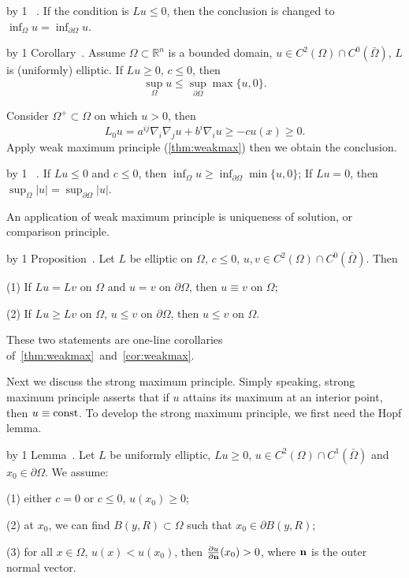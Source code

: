 \advance\propcount by 1
~\/\propnumber.
If the condition is $Lu\leq 0$, then the conclusion is changed to $\inf_{\Omega}u=\inf_{\partial\Omega}u$.
\medskip

\advance\propcount by 1
\proclaim Corollary~\propnumber.
Assume $\Omega\subset\mathbb{R}^n$ is a bounded domain, $u\in C^2(\Omega)\cap C^0(\bar\Omega)$, $L$ is (uniformly) elliptic.
If $Lu\geq 0$, $c\leq 0$, then
$$\sup_{\Omega}u\leq\sup_{\partial\Omega}\max\{u,0\}.$$

\demo
Consider $\Omega^+\subset\Omega$ on which $u>0$, then
$$L_0u=a^{ij}\nabla_i\nabla_ju+b^i\nabla_iu\geq-cu(x)\geq 0.$$
Apply weak maximum principle (\ref{thm:weakmax}) then we obtain the conclusion.
\enddemo

\advance\propcount by 1
~\/\propnumber.
If $Lu\leq 0$ and $c\leq 0$, then $\inf_{\Omega}u\geq\inf_{\partial\Omega}\min\{u,0\}$;
If $Lu=0$, then $\sup_\Omega|u|=\sup_{\partial\Omega}|u|$.
\medskip

An application of weak maximum principle is uniqueness of solution, or comparison principle.

\advance\propcount by 1
\proclaim Proposition~\propnumber.
Let $L$ be elliptic on $\Omega$, $c\leq 0$, $u,v\in C^2(\Omega)\cap C^0(\bar\Omega)$.
Then
\smallskip
\item {\rm(1)} If $Lu=Lv$ on $\Omega$ and $u=v$ on $\partial\Omega$, then $u\equiv v$ on $\Omega$;
\item {\rm(2)} If $Lu\geq Lv$ on $\Omega$, $u\leq v$ on $\partial\Omega$, then $u\leq v$ on $\Omega$.

These two statements are one-line corollaries of~\ref{thm:weakmax}~and~\ref{cor:weakmax}.

Next we discuss the strong maximum principle.
Simply speaking, strong maximum principle asserts that if $u$ attains its maximum at an interior point, then $u\equiv{\rm const}$.
To develop the strong maximum principle, we first need the Hopf lemma.

\advance\propcount by 1
\proclaim Lemma~\propnumber.
Let $L$ be uniformly elliptic, $Lu\geq 0$, $u\in C^2(\Omega)\cap C^1(\bar\Omega)$ and $x_0\in\partial\Omega$.
We assume:
\smallskip
\item {\rm(1)} either $c=0$ or $c\leq 0$, $u(x_0)\geq 0$;
\item {\rm(2)} at $x_0$, we can find $B(y,R)\subset\Omega$ such that $x_0\in\partial B(y,R)$;
\item {\rm(3)} for all $x\in\Omega$, $u(x)<u(x_0)$,
\smallskip
\noindent then ${\partial u\over\partial{\bf n}}(x_0)>0$, where $\bf n$ is the outer normal vector.

